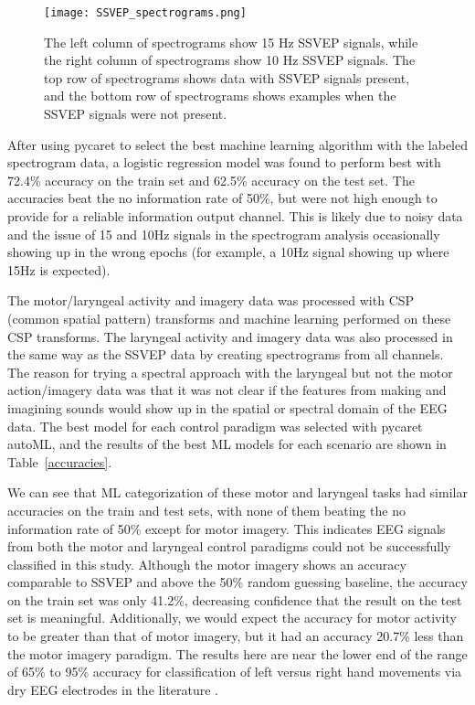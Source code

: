 \documentclass{article}
\begin{document}
\begin{figure}
    \centering
    \texttt{[image: SSVEP\_spectrograms.png]}
    \caption{The left column of spectrograms show 15 Hz SSVEP signals, while the right column of spectrograms show 10 Hz SSVEP signals. The top row of spectrograms shows data with SSVEP signals present, and the bottom row of spectrograms shows examples when the SSVEP signals were not present.}
    \label{ssvep_spectrograms}
\end{figure}

After using pycaret to select the best machine learning algorithm with the labeled spectrogram data, a logistic regression model was found to perform best with 72.4\% accuracy on the train set and 62.5\% accuracy on the test set. The accuracies beat the no information rate of 50\%, but were not high enough to provide for a reliable information output channel. This is likely due to noisy data and the issue of 15 and 10Hz signals in the spectrogram analysis occasionally showing up in the wrong epochs (for example, a 10Hz signal showing up where 15Hz is expected).

The motor/laryngeal activity and imagery data was processed with CSP (common spatial pattern) transforms and machine learning performed on these CSP transforms. The laryngeal activity and imagery data was also processed in the same way as the SSVEP data by creating spectrograms from all channels. The reason for trying a spectral approach with the laryngeal but not the motor action/imagery data was that it was not clear if the features from making and imagining sounds would show up in the spatial or spectral domain of the EEG data. The best model for each control paradigm was selected with pycaret autoML, and the results of the best ML models for each scenario are shown in Table~\ref{accuracies}.

We can see that ML categorization of these motor and laryngeal tasks had similar accuracies on the train and test sets, with none of them beating the no information rate of 50\% except for motor imagery.  This indicates EEG signals from both the motor and laryngeal control paradigms could not be successfully classified in this study. Although the motor imagery shows an accuracy comparable to SSVEP and above the 50\% random guessing baseline, the accuracy on the train set was only 41.2\%, decreasing confidence that the result on the test set is meaningful. Additionally, we would expect the accuracy for motor activity to be greater than that of motor imagery, but it had an accuracy 20.7\% less than the motor imagery paradigm. The results here are near the lower end of the range of 65\% to 95\% accuracy for classification of left versus right hand movements via dry EEG electrodes in the literature \citep{quiles_low-cost_2020, irimia_high_2018}.
\end{document}
